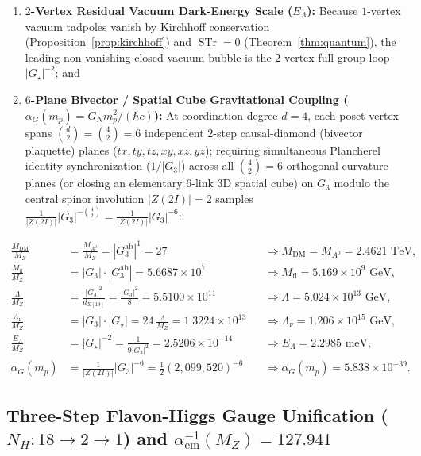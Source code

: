 \documentclass[11pt,a4paper]{article}
\theoremstyle{definition}
\theoremstyle{remark}
\newcommand{\STr}{\operatorname{STr}}
\newcommand{\Gthree}{G_3}
\newcommand{\Gstar}{G_\star}
\begin{document}
\begin{enumerate}
    \item \textbf{$2$-Vertex Residual Vacuum Dark-Energy Scale ($E_\Lambda$):} Because $1$-vertex vacuum tadpoles vanish by Kirchhoff conservation (Proposition~\ref{prop:kirchhoff}) and $\STr = 0$ (Theorem~\ref{thm:quantum}), the leading non-vanishing closed vacuum bubble is the $2$-vertex full-group loop $|\Gstar|^{-2}$; and
    \item \textbf{$6$-Plane Bivector / Spatial Cube Gravitational Coupling ($\alpha_G(m_p) = G_N m_p^2 / (\hbar c)$):} At coordination degree $d = 4$, each poset vertex spans $\binom{d}{2} = \binom{4}{2} = 6$ independent $2$-step causal-diamond (bivector plaquette) planes ($tx, ty, tz, xy, xz, yz$); requiring simultaneous Plancherel identity synchronization ($1/|\Gthree|$) across all $\binom{4}{2} = 6$ orthogonal curvature planes (or closing an elementary $6$-link 3D spatial cube) on $\Gthree$ modulo the central spinor involution $|Z(2I)| = 2$ samples $\frac{1}{|Z(2I)|}|\Gthree|^{-\binom{4}{2}} = \frac{1}{|Z(2I)|}|\Gthree|^{-6}$:
\end{enumerate}
\begin{align}
\frac{M_{\mathrm{DM}}}{M_Z} &= \frac{M_{A^0}}{M_Z} = |\Gthree^{\mathrm{ab}}|^1 = 27 &&\Longrightarrow M_{\mathrm{DM}} = M_{A^0} = 2.4621\text{ TeV}, \label{eq:scale_mdm} \\
\frac{M_{\mathrm{fl}}}{M_Z} &= |\Gthree| \cdot |\Gthree^{\mathrm{ab}}| = 5.6687 \times 10^7 &&\Longrightarrow M_{\mathrm{fl}} = 5.169 \times 10^9\text{ GeV}, \label{eq:scale_mfl} \\
\frac{\Lambda}{M_Z} &= \frac{|\Gthree|^2}{d_{\Sigma[19]}} = \frac{|\Gthree|^2}{8} = 5.5100 \times 10^{11} &&\Longrightarrow \Lambda = 5.024 \times 10^{13}\text{ GeV}, \label{eq:scale_lambda} \\
\frac{\Lambda_\nu}{M_Z} &= |\Gthree| \cdot |\Gstar| = 24\,\frac{\Lambda}{M_Z} = 1.3224 \times 10^{13} &&\Longrightarrow \Lambda_\nu = 1.206 \times 10^{15}\text{ GeV}, \label{eq:scale_lambdanu} \\
\frac{E_\Lambda}{M_Z} &= |\Gstar|^{-2} = \frac{1}{9|\Gthree|^2} = 2.5206 \times 10^{-14} &&\Longrightarrow E_\Lambda = 2.2985\text{ meV}, \label{eq:scale_elambda} \\
\alpha_G(m_p) &= \frac{1}{|Z(2I)|}|\Gthree|^{-6} = \frac{1}{2}(2{,}099{,}520)^{-6} &&\Longrightarrow \alpha_G(m_p) = 5.838 \times 10^{-39}. \label{eq:scale_alphag}
\end{align}

\subsection{Three-Step Flavon-Higgs Gauge Unification ($N_H: 18 \to 2 \to 1$) and $\alpha_{\mathrm{em}}^{-1}(M_Z) = 127.941$}
\end{document}
